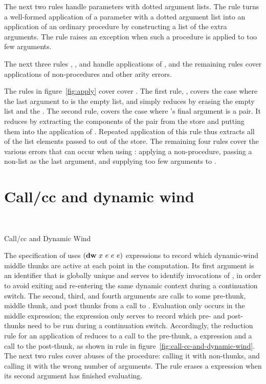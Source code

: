 The next two rules handle parameters with dotted argument lists. The
rule  turns a well-formed application of a
parameter with a dotted argument list into an application of an
ordinary procedure by constructing a list of the extra arguments. The
 rule raises an exception when such a procedure
is applied to too few arguments.

The next three rules , , and
 handle applications of , and the
remaining rules cover applications of non-procedures and other arity
errors.

The rules in figure~\ref{fig:apply} cover 
cover . The first
rule, , covers the case where the last argument to
 is the empty list, and simply reduces by erasing the
empty list and the . The second rule, 
covers the case where 's final argument is a pair. It
reduces by extracting the components of the pair from the store and
putting them into the application of . Repeated
application of this rule thus extracts all of the list elements passed
to  out of the store. The remaining four rules cover the
various errors that can occur when using : applying a
non-procedure, passing a non-list as the last argument, and supplying
too few arguments to .

\section{Call/cc and dynamic wind}

\beginfig
\begin{center}
 \\

\end{center}
\caption{Call/cc and Dynamic Wind}\label{fig:call-cc-and-dynamic-wind}
\endfig

The specification of  uses $(\textnormal{\textbf{dw}}~x~e~e~e)$
expressions to record which dynamic-wind middle thunks are active at
each point in the computation. Its first argument is an identifier
that is globally unique and serves to identify invocations of
, in order to avoid exiting and re-entering the
same dynamic context during a continuation switch. The second, third,
and fourth arguments are calls to some pre-thunk, middle thunk, and
post thunks from a call to . Evaluation only
occurs in the middle expression; the  expression only
serves to record which pre- and post- thunks need to be run during a
continuation switch. Accordingly, the reduction rule for an
application of  reduces to a call to the
pre-thunk, a  expression and a call to the post-thunk, as
shown in rule  in
figure~\ref{fig:call-cc-and-dynamic-wind}. The next two rules cover
abuses of the  procedure: calling it with
non-thunks, and calling it with the wrong number of arguments. The
 rule erases a  expression when its second
argument has finished evaluating.

